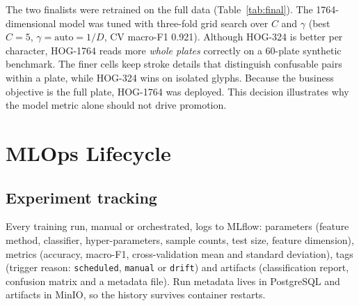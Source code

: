 \documentclass[conference]{IEEEtran}
\newcommand{\code}[1]{\texttt{#1}}
\begin{document}
The two finalists were retrained on the full data (Table~\ref{tab:final}). The
1764-dimensional model was tuned with three-fold grid search over $C$ and
$\gamma$ (best $C=5$, $\gamma=\text{auto}=1/D$, CV macro-F1 0.921). Although
HOG-324 is better per character, HOG-1764 reads more \emph{whole plates} correctly
on a 60-plate synthetic benchmark. The finer cells keep stroke details that
distinguish confusable pairs within a plate, while HOG-324 wins on isolated
glyphs. Because the business objective is the full plate, HOG-1764 was deployed.
This decision illustrates why the model metric alone should not drive promotion.

\begin{table}[t]
\centering
\caption{Finalists trained on the full synthetic set}
\label{tab:final}
\end{table}

\section{MLOps Lifecycle}\label{sec:mlops}
\subsection{Experiment tracking}
Every training run, manual or orchestrated, logs to MLflow: parameters
(feature method, classifier, hyper-parameters, sample counts, test size, feature
dimension), metrics (accuracy, macro-F1, cross-validation mean and standard
deviation), tags (trigger reason: \code{scheduled}, \code{manual} or
\code{drift}) and artifacts (classification report, confusion matrix and a
metadata file). Run metadata lives in PostgreSQL and artifacts in MinIO, so the
history survives container restarts.
\end{document}
